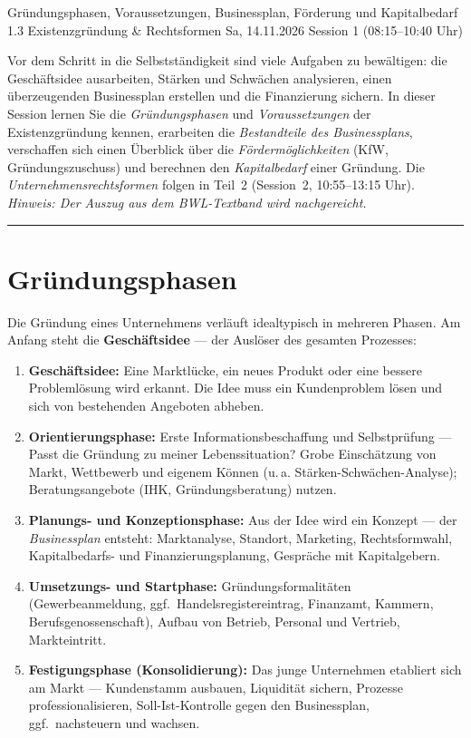 \documentclass[11pt, a4paper]{article}
\begin{document}
%
  {Gründungsphasen, Voraussetzungen, Businessplan, Förderung und Kapitalbedarf}%
  {1.3 Existenzgründung \& Rechtsformen}%
  {Sa, 14.11.2026 \textperiodcentered{} Session 1 (08:15--10:40 Uhr)}

\begin{merksatz}[title={\bfseries Worum geht es in Teil 1?}]
Vor dem Schritt in die Selbstständigkeit sind viele Aufgaben zu bewältigen: die
Geschäftsidee ausarbeiten, Stärken und Schwächen analysieren, einen überzeugenden
Businessplan erstellen und die Finanzierung sichern. In dieser Session lernen Sie die
\emph{Gründungsphasen} und \emph{Voraussetzungen} der Existenzgründung kennen, erarbeiten
die \emph{Bestandteile des Businessplans}, verschaffen sich einen Überblick über die
\emph{Fördermöglichkeiten} (KfW, Gründungszuschuss) und berechnen den
\emph{Kapitalbedarf} einer Gründung. Die \emph{Unternehmensrechtsformen} folgen in
Teil~2 (Session~2, 10:55--13:15 Uhr). \emph{Hinweis: Der Auszug aus dem BWL-Textband
wird nachgereicht.}
\end{merksatz}

\tableofcontents
\vspace{1em}
\hrule
\vspace{1em}

\section{Gründungsphasen}

Die Gründung eines Unternehmens verläuft idealtypisch in mehreren Phasen. Am Anfang steht
die \textbf{Geschäftsidee} --- der Auslöser des gesamten Prozesses:

\begin{enumerate}
  \item \textbf{Geschäftsidee:} Eine Marktlücke, ein neues Produkt oder eine bessere
    Problemlösung wird erkannt. Die Idee muss ein Kundenproblem lösen und sich von
    bestehenden Angeboten abheben.
  \item \textbf{Orientierungsphase:} Erste Informationsbeschaffung und Selbstprüfung ---
    Passt die Gründung zu meiner Lebenssituation? Grobe Einschätzung von Markt, Wettbewerb
    und eigenem Können (u.\,a. Stärken-Schwächen-Analyse); Beratungsangebote (IHK,
    Gründungsberatung) nutzen.
  \item \textbf{Planungs- und Konzeptionsphase:} Aus der Idee wird ein Konzept --- der
    \emph{Businessplan} entsteht: Marktanalyse, Standort, Marketing, Rechtsformwahl,
    Kapitalbedarfs- und Finanzierungsplanung, Gespräche mit Kapitalgebern.
  \item \textbf{Umsetzungs- und Startphase:} Gründungsformalitäten (Gewerbeanmeldung,
    ggf.\ Handelsregistereintrag, Finanzamt, Kammern, Berufsgenossenschaft), Aufbau von
    Betrieb, Personal und Vertrieb, Markteintritt.
  \item \textbf{Festigungsphase (Konsolidierung):} Das junge Unternehmen etabliert sich am
    Markt --- Kundenstamm ausbauen, Liquidität sichern, Prozesse professionalisieren,
    Soll-Ist-Kontrolle gegen den Businessplan, ggf.\ nachsteuern und wachsen.
\end{enumerate}
\end{document}
